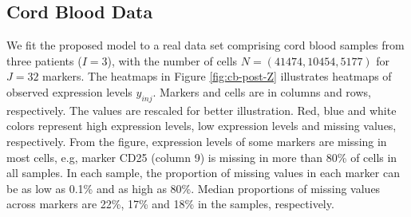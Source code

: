 \documentclass[12pt,]{article}
\begin{document}
\subsection{Cord Blood Data}\label{sec:CB-real}
We fit the proposed model to a real data set comprising cord blood samples from
three patients ($I=3$), with the number of cells $N=(41474, 10454, 5177)$ for $J=32$
markers. The heatmaps in Figure \ref{fig:cb-post-Z} illustrates heatmaps of
observed expression levels $y_{inj}$.  Markers and cells are in columns and
rows, respectively. The values are rescaled for better illustration.  Red, blue and
white colors represent high expression levels, low expression levels and missing
values, respectively.  From the figure, expression levels of some markers are
missing in most cells, e.g, marker CD25 (column 9) is missing in more than 80\%
of cells in all samples.
%
In each sample, the proportion of missing values in each marker can be as low
as 0.1\% and as high as 80\%.  Median proportions of missing values across
markers are 22\%, 17\% and 18\% in the samples, respectively.
\end{document}
